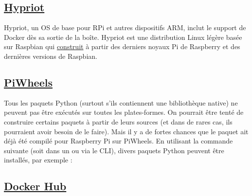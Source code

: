 \subsection{\href{https://blog.hypriot.com/}{Hypriot}}\label{subsec:hypriot}

Hypriot, un OS de base pour RPi et autres dispositifs ARM, inclut le support de Docker dès sa sortie de la boîte. Hypriot est une distribution Linux légère basée sur Raspbian qui \href{https://github.com/hypriot/image-builder-rpi}{construit} à partir des derniers noyaux Pi de Raspberry et des dernières versions de Raspbian.

\subsection{\href{https://www.piwheels.org/}{PiWheels}}

Tous les paquets Python (surtout s'ils contiennent une bibliothèque native) ne peuvent pas être exécutés sur toutes les plates-formes. On pourrait être tenté de construire certains paquets à partir de leurs sources (et dans de rares cas, ils pourraient avoir besoin de le faire). Mais il y a de fortes chances que le paquet ait déjà été compilé pour Raspberry Pi sur PiWheels. En utilisant la commande suivante (soit dans un  ou via le CLI), divers paquets Python peuvent être installés, par exemple :
%

\subsection{\href{https://hub.docker.com/}{Docker Hub}}\label{subsec:docker_hub}

